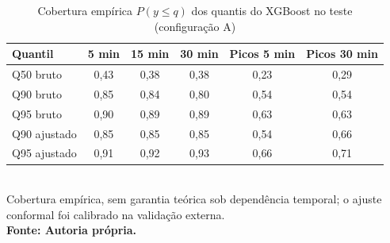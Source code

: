 \begin{table}[htb]
\caption{Cobertura empírica $P(y \leq q)$ dos quantis do XGBoost no teste (configuração A)}
\label{tab:v3-quantis}
\centering
\footnotesize
\setlength{\tabcolsep}{3pt}
\renewcommand{\arraystretch}{1.15}
\begin{tabular}{|l|c|c|c|c|c|}
\hline
\textbf{Quantil} & \textbf{5 min} & \textbf{15 min} & \textbf{30 min} & \textbf{Picos 5 min} & \textbf{Picos 30 min} \\
\hline
Q50 bruto & 0{,}43 & 0{,}38 & 0{,}38 & 0{,}23 & 0{,}29 \\
Q90 bruto & 0{,}85 & 0{,}84 & 0{,}80 & 0{,}54 & 0{,}54 \\
Q95 bruto & 0{,}90 & 0{,}89 & 0{,}89 & 0{,}63 & 0{,}63 \\
Q90 ajustado & 0{,}85 & 0{,}85 & 0{,}85 & 0{,}54 & 0{,}66 \\
Q95 ajustado & 0{,}91 & 0{,}92 & 0{,}93 & 0{,}66 & 0{,}71 \\
\hline
\end{tabular}\\
\footnotesize Cobertura empírica, sem garantia teórica sob dependência temporal; o ajuste conformal foi calibrado na validação externa.\\
\textbf{\footnotesize Fonte: Autoria própria.}
\end{table}
